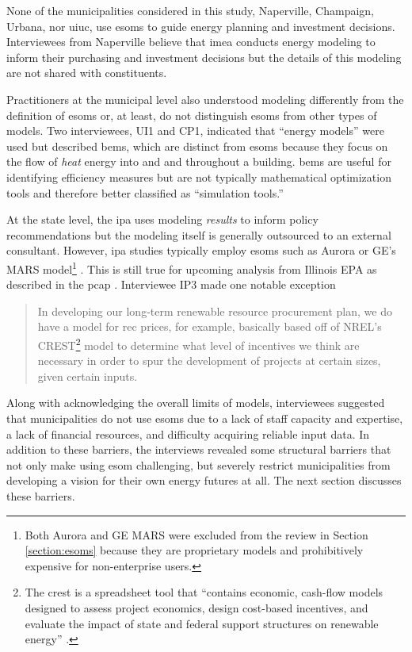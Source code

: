 None of the municipalities considered in this study, Naperville, Champaign,
Urbana, nor \ac{uiuc}, use \acp{esom} to guide energy planning and investment
decisions. Interviewees from Naperville believe that \ac{imea} conducts energy
modeling to inform their purchasing and investment decisions but the details of
this modeling are not shared with constituents.

Practitioners at the municipal level also understood modeling differently from
the definition of \acp{esom} or, at least, do not distinguish \acp{esom} from
other types of models. Two interviewees, UI1 and CP1, indicated that ``energy
models'' were used but described \acp{bem}, which are distinct from \acp{esom}
because they focus on the flow of \textit{heat} energy into and and throughout a
building. \acp{bem} are useful for identifying efficiency measures but are not
typically mathematical optimization tools and therefore better classified as
``simulation tools.''

At the state level, the \ac{ipa} uses modeling \textit{results} to inform policy
recommendations but the modeling itself is generally outsourced to an external
consultant. However, \ac{ipa} studies typically employ \acp{esom} such as Aurora
or GE's MARS model\footnote{Both Aurora and GE MARS were excluded from the
review in Section \ref{section:esoms} because they are proprietary models and
prohibitively expensive for non-enterprise users.}
\cite{bringolf_evaluation_2024, carlson_illinois_2024}. This is still true for
upcoming analysis from Illinois EPA as described in the \ac{pcap}
\cite{kibbey_state_2024}. Interviewee IP3 made one notable exception 
\begin{quote}
    In developing our long-term renewable resource procurement plan, we do have
    a model for \ac{rec} prices, for example, basically based off of NREL's
    CREST\footnote{The \ac{crest} is a spreadsheet tool that ``contains
    economic, cash-flow models designed to assess project economics, design
    cost-based incentives, and evaluate the impact of state and federal support
    structures on renewable energy'' \cite{gifford_renewable_2011}. } model to
    determine what level of incentives we think are necessary in order to spur
    the development of projects at certain sizes, given certain inputs.
\end{quote}

Along with acknowledging the overall limits of models, interviewees suggested
that municipalities do not use \acp{esom} due to a lack of staff capacity and
expertise, a lack of financial resources, and difficulty acquiring reliable
input data. In addition to these barriers, the interviews revealed some
structural barriers that not only make using \ac{esom} challenging, but severely
restrict municipalities from developing a vision for their own energy futures at
all. The next section discusses these barriers.


